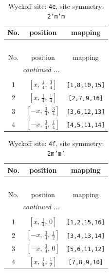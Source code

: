 \documentclass[fleqn,8pt]{jsarticle}
\begin{document}
\renewcommand{\arraystretch}{1.2}
\begin{longtable}{ccc}
\caption{Wyckoff site: {\tt 4e}, site symmetry: {\tt 2'm'm}}
 \\
 \hline \hline
No. & position & mapping \\ \hline \endfirsthead

\multicolumn{2}{l}{\tablename\ \thetable{}} \\
 \hline \hline
No. & position & mapping \\ \hline \endhead

 \hline \hline
\multicolumn{2}{r}{\footnotesize\it continued ...} \\ \endfoot

 \hline \hline
\multicolumn{2}{r}{} \\ \endlastfoot

1 & $\left[ x,\, \frac{1}{4},\, \frac{3}{4} \right]$ & {\tt [1,8,10,15]} \\ \hline
2 & $\left[ x,\, \frac{1}{4},\, \frac{1}{4} \right]$ & {\tt [2,7,9,16]} \\ \hline
3 & $\left[ - x,\, \frac{3}{4},\, \frac{3}{4} \right]$ & {\tt [3,6,12,13]} \\ \hline
4 & $\left[ - x,\, \frac{3}{4},\, \frac{1}{4} \right]$ & {\tt [4,5,11,14]} \\
\end{longtable}
\renewcommand{\arraystretch}{1.2}
\begin{longtable}{ccc}
\caption{Wyckoff site: {\tt 4f}, site symmetry: {\tt 2m'm'}}
 \\
 \hline \hline
No. & position & mapping \\ \hline \endfirsthead

\multicolumn{2}{l}{\tablename\ \thetable{}} \\
 \hline \hline
No. & position & mapping \\ \hline \endhead

 \hline \hline
\multicolumn{2}{r}{\footnotesize\it continued ...} \\ \endfoot

 \hline \hline
\multicolumn{2}{r}{} \\ \endlastfoot

1 & $\left[ x,\, \frac{1}{4},\, 0 \right]$ & {\tt [1,2,15,16]} \\ \hline
2 & $\left[ - x,\, \frac{3}{4},\, \frac{1}{2} \right]$ & {\tt [3,4,13,14]} \\ \hline
3 & $\left[ - x,\, \frac{3}{4},\, 0 \right]$ & {\tt [5,6,11,12]} \\ \hline
4 & $\left[ x,\, \frac{1}{4},\, \frac{1}{2} \right]$ & {\tt [7,8,9,10]} \\
\end{longtable}
\end{document}
